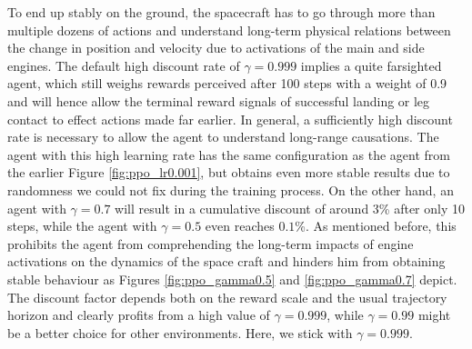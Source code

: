 \documentclass[a4paper, 11pt]{article}
\begin{document}
	To end up stably on the ground, the spacecraft has to go through more than multiple dozens of actions and understand long-term physical relations between the change in position and velocity due to activations of the main and side engines.
	The default high discount rate of $\gamma=0.999$ implies a quite farsighted agent, which still weighs rewards perceived after 100 steps with a weight of 0.9 and will hence allow the terminal reward signals of successful landing or leg contact to effect actions made far earlier.
	In general, a sufficiently high discount rate is necessary to allow the agent to understand long-range causations. The agent with this high learning rate has the same configuration as the agent from the earlier Figure \ref{fig:ppo_lr0.001}, but obtains even more stable results due to randomness we could not fix during the training process. On the other hand, an agent with $\gamma=0.7$ will result in a cumulative discount of around 3\% after only 10 steps, while the agent with $\gamma=0.5$ even reaches $0.1$\%. As mentioned before, this prohibits the agent from comprehending the long-term impacts of engine activations on the dynamics of the space craft and hinders him from obtaining stable behaviour as Figures \ref{fig:ppo_gamma0.5} and \ref{fig:ppo_gamma0.7} depict. The discount factor depends both on the reward scale and the usual trajectory horizon and clearly profits from a high value of $\gamma=0.999$, while $\gamma=0.99$ might be a better choice for other environments. 
	Here, we stick with $\gamma=0.999$.
	
\end{document}
